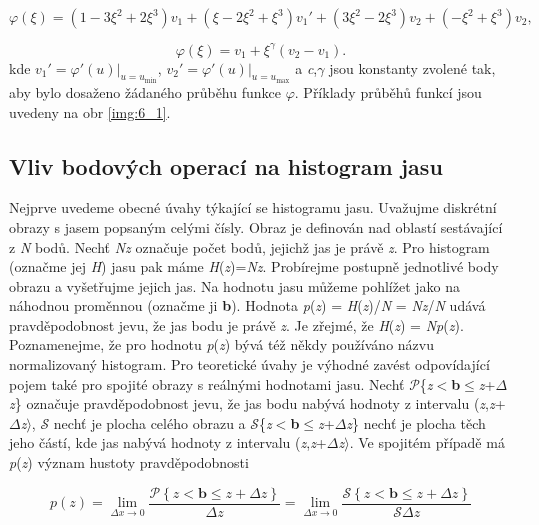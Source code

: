 \begin{equation} \label{eq:6_5}
    \varphi(\xi) = (1 - 3\xi^2 + 2\xi^3)v_1 + ( \xi -2\xi^2 + \xi^3)v_1' + (3\xi^2 - 2\xi^3)v_2 + ( -\xi^2 + \xi^3)v_2,
\end{equation}

\begin{equation} \label{eq:6_6}
    \varphi(\xi) = v_1 + \xi^\gamma (v_2 - v_1 ).
\end{equation}
kde $v_1' = \varphi'(u) |_{u=u_{\min}}$, $v_2' = \varphi'(u) |_{u=u_{\max}}$ a \textit{c},$\gamma$ jsou konstanty zvolené tak, aby bylo dosaženo žádaného průběhu funkce $\varphi$. Příklady průběhů funkcí jsou uvedeny na obr \ref{img:6_1}.

\subsection*{Vliv bodových operací na histogram jasu}

Nejprve uvedeme obecné úvahy týkající se histogramu jasu. Uvažujme diskrétní obrazy s jasem popsaným celými čísly. Obraz je definován nad oblastí sestávající z \textit{N} bodů. Nechť \textit{Nz} označuje počet bodů, jejichž jas je právě \textit{z}. Pro histogram (označme jej \textit{H}) jasu pak máme \textit{H}(\textit{z})=\textit{Nz}. Probírejme postupně jednotlivé body obrazu a vyšetřujme jejich jas. Na hodnotu jasu můžeme pohlížet jako na náhodnou proměnnou (označme ji \textbf{b}). Hodnota \textit{p}(\textit{z}) = \textit{H}(\textit{z})/\textit{N} = \textit{Nz}/\textit{N} udává pravděpodobnost jevu, že jas bodu je právě \textit{z}. Je zřejmé, že \textit{H}(\textit{z}) = \textit{Np}(\textit{z}). Poznamenejme, že pro hodnotu \textit{p}(\textit{z}) bývá též někdy používáno názvu normalizovaný histogram. Pro teoretické úvahy je výhodné zavést odpovídající pojem také pro spojité obrazy s reálnými hodnotami jasu. Nechť $\mathscr{P}$\{\textit{z}$<$\textbf{b}$\leq$\textit{z}+$\Delta$\textit{z}\} označuje pravděpodobnost jevu, že jas bodu nabývá hodnoty z intervalu (\textit{z},\textit{z}+$\Delta$\textit{z}$\rangle$, $\mathscr{S}$ nechť je plocha celého obrazu a $\mathscr{S}$\{\textit{z}$<$\textbf{b}$\leq$\textit{z}+$\Delta$\textit{z}\} nechť je plocha těch jeho částí, kde jas nabývá hodnoty z intervalu  (\textit{z},\textit{z}+$\Delta$\textit{z}$\rangle$. Ve spojitém případě má \textit{p}(\textit{z}) význam hustoty pravděpodobnosti

\begin{equation} \label{eq:6_7}
    p(z) = \lim\limits_{\Delta x \rightarrow 0} \frac{\mathscr{P} \left\{ z < \mathbf{b} \leq z+\Delta z \right\} }{\Delta z} = \lim\limits_{\Delta x \rightarrow 0} \frac{\mathscr{S} \left\{ z < \mathbf{b} \leq z+\Delta z \right\} }{\mathscr{S}\Delta z}
\end{equation}

